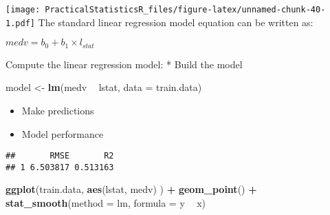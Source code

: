 \documentclass[
]{article}
\newenvironment{Shaded}{\begin{snugshade}}{\end{snugshade}}
\newcommand{\DataTypeTok}[1]{\textcolor[rgb]{0.13,0.29,0.53}{#1}}
\newcommand{\KeywordTok}[1]{\textcolor[rgb]{0.13,0.29,0.53}{\textbf{#1}}}
\newcommand{\NormalTok}[1]{#1}
\newcommand{\OperatorTok}[1]{\textcolor[rgb]{0.81,0.36,0.00}{\textbf{#1}}}
\newcommand{\StringTok}[1]{\textcolor[rgb]{0.31,0.60,0.02}{#1}}
\providecommand{\tightlist}{%
  \setlength{\itemsep}{0pt}\setlength{\parskip}{0pt}}
\begin{document}
\texttt{[image: PracticalStatisticsR\_files/figure-latex/unnamed-chunk-40-1.pdf]}
The standard linear regression model equation can be written as:

\(medv = b_0 + b_1 \times l_{stat}\)

Compute the linear regression model: * Build the model

\begin{Shaded}
\begin{Highlighting}[]
\NormalTok{model <-}\StringTok{ }\KeywordTok{lm}\NormalTok{(medv }\OperatorTok{~}\StringTok{ }\NormalTok{lstat, }\DataTypeTok{data =}\NormalTok{ train.data)}
\end{Highlighting}
\end{Shaded}

\begin{itemize}
\tightlist
\item
  Make predictions
\end{itemize}

\begin{Shaded}
\end{Shaded}

\begin{itemize}
\tightlist
\item
  Model performance
\end{itemize}

\begin{Shaded}
\end{Shaded}

\begin{verbatim}
##       RMSE       R2
## 1 6.503817 0.513163
\end{verbatim}

\begin{Shaded}
\begin{Highlighting}[]
\KeywordTok{ggplot}\NormalTok{(train.data, }\KeywordTok{aes}\NormalTok{(lstat, medv) ) }\OperatorTok{+}
\StringTok{  }\KeywordTok{geom_point}\NormalTok{() }\OperatorTok{+}
\StringTok{  }\KeywordTok{stat_smooth}\NormalTok{(}\DataTypeTok{method =}\NormalTok{ lm, }\DataTypeTok{formula =}\NormalTok{ y }\OperatorTok{~}\StringTok{ }\NormalTok{x)}
\end{Highlighting}
\end{Shaded}
\end{document}
